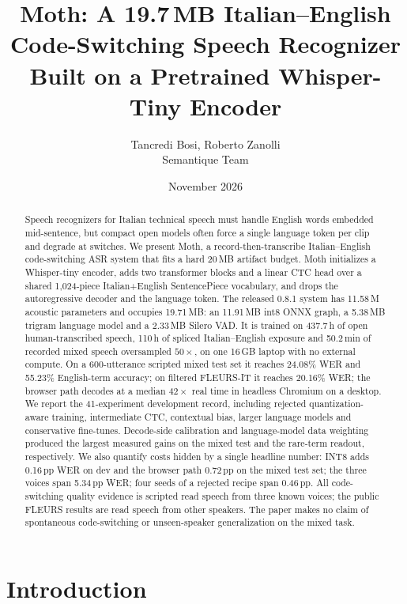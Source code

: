 \documentclass{article}
\title{Moth: A 19.7\,MB Italian--English Code-Switching Speech Recognizer\\Built on a Pretrained Whisper-Tiny Encoder}
\author{Tancredi Bosi, Roberto Zanolli \\
  Semantique Team}
\date{November 2026}
\newcommand{\moth}{Moth}
\begin{document}
\maketitle

\begin{abstract}
Speech recognizers for Italian technical speech must handle English words embedded mid-sentence,
but compact open models often force a single language token per clip and degrade at switches.
We present \moth, a record-then-transcribe Italian--English code-switching ASR system that fits a
hard 20\,MB artifact budget. \moth{} initializes a Whisper-tiny encoder, adds two transformer
blocks and a linear CTC head over a shared 1{,}024-piece Italian+English SentencePiece vocabulary,
and drops the autoregressive decoder and the language token. The released 0.8.1 system has
11.58\,M acoustic parameters and occupies 19.71\,MB: an 11.91\,MB int8 ONNX graph, a 5.38\,MB
trigram language model and a 2.33\,MB Silero VAD. It is trained on 437.7\,h of open
human-transcribed speech, 110\,h of spliced Italian--English exposure and 50.2\,min of recorded mixed speech
oversampled $50\times$, on one
16\,GB laptop with no external compute. On a 600-utterance scripted mixed test set it reaches
24.08\% WER and 55.23\% English-term accuracy; on filtered FLEURS-IT it reaches 20.16\% WER; the
browser path decodes at a median $42\times$ real time in headless Chromium on a desktop. We report the 41-experiment
development record, including rejected quantization-aware training, intermediate CTC, contextual
bias, larger language models and conservative fine-tunes. Decode-side calibration and
language-model data weighting produced the largest measured gains on the mixed test and the rare-term readout, respectively. We also quantify costs hidden
by a single headline number: INT8 adds 0.16\,pp WER on dev and the browser path 0.72\,pp on the
mixed test set; the three voices span 5.34\,pp WER; four seeds of a rejected recipe span 0.46\,pp. All code-switching quality evidence is scripted read speech from three known voices; the public
FLEURS results are read speech from other speakers. The paper makes no claim of spontaneous
code-switching or unseen-speaker generalization on the mixed task.
\end{abstract}


\section{Introduction}
\end{document}
